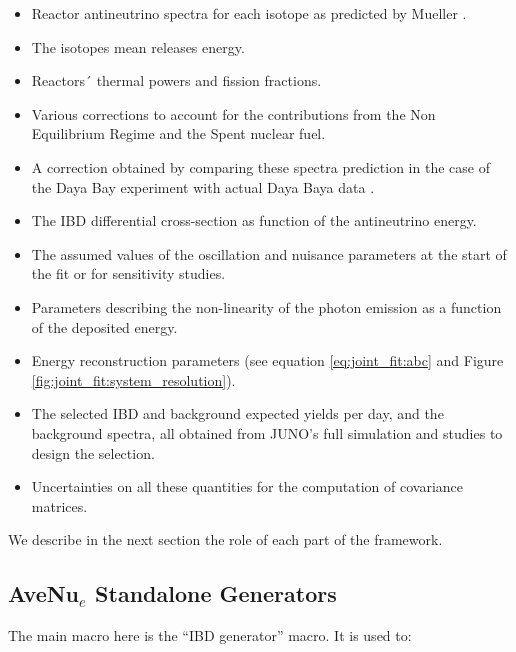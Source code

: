 \documentclass[../main.tex]{subfiles}
\begin{document}
\begin{itemize}
  \item Reactor antineutrino spectra for each isotope as predicted by Mueller \cite{mueller_improved_2011-1}.
  \item The isotopes mean releases energy.
  \item Reactors´ thermal powers and fission fractions.
  \item Various corrections to account for the contributions from the Non Equilibrium Regime and the Spent nuclear fuel.
  \item A correction obtained by comparing these spectra prediction in the case of the Daya Bay experiment with actual Daya Baya data \cite{daya_bay_collaboration_measurement_2016}.
  \item The IBD differential cross-section as function of the antineutrino energy.
  \item The assumed values of the oscillation and nuisance parameters at the start of the fit or for sensitivity studies.
  \item Parameters describing the non-linearity of the photon emission as a function of the deposited energy.
  \item Energy reconstruction parameters (see equation \ref{eq:joint_fit:abc} and Figure \ref{fig:joint_fit:system_resolution}).
  \item The selected IBD and background expected yields per day, and the background spectra, all obtained from JUNO's full simulation and studies to design the selection.
  \item Uncertainties on all these quantities for the computation of covariance matrices.
\end{itemize}
\hfill

We describe in the next section the role of each part of the framework.


\subsection{AveNu$_e$ Standalone Generators}

The main macro here is the ``IBD generator'' macro. It is used to:
\end{document}
